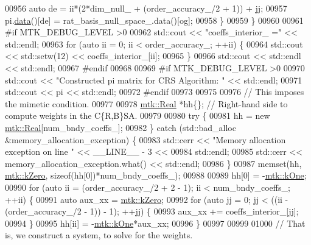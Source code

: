\begin{DoxyCode}
{{00956       \textcolor{keyword}{auto} de = ii*(2*dim\_null\_ + (order\_accuracy\_/2 + 1)) + jj;
00957       pi.\hyperlink{classmtk_1_1DenseMatrix_a16b3ff56feb2658b9fc7147d1de4d8e7}{data}()[de] = rat\_basis\_null\_space\_.data()[og];
00958     \}
00959   \}
00960 
00961 \textcolor{preprocessor}{  #if MTK\_DEBUG\_LEVEL >0}
00962   std::cout << \textcolor{stringliteral}{"coeffs\_interior\_ ="} << std::endl;
00963   \textcolor{keywordflow}{for} (\textcolor{keyword}{auto} ii = 0; ii < order\_accuracy\_; ++ii) \{
00964     std::cout << std::setw(12) << coeffs\_interior\_[ii];
00965   \}
00966   std::cout << std::endl << std::endl;
00967 \textcolor{preprocessor}{  #endif}
00968 
00969 \textcolor{preprocessor}{  #if MTK\_DEBUG\_LEVEL >0}
00970   std::cout << \textcolor{stringliteral}{"Constructed pi matrix for CRS Algorithm: "} << std::endl;
00971   std::cout << pi << std::endl;
00972 \textcolor{preprocessor}{  #endif}
00973 
00975 
00976   \textcolor{comment}{// This imposes the mimetic condition.}
00977 
00978   \hyperlink{group__c01-roots_gac080bbbf5cbb5502c9f00405f894857d}{mtk::Real} *hh\{\};  \textcolor{comment}{// Right-hand side to compute weights in the C\{R,B\}SA.}
00979 
00980   \textcolor{keywordflow}{try} \{
00981     hh = \textcolor{keyword}{new} \hyperlink{group__c01-roots_gac080bbbf5cbb5502c9f00405f894857d}{mtk::Real}[num\_bndy\_coeffs\_];
00982   \} \textcolor{keywordflow}{catch} (std::bad\_alloc &memory\_allocation\_exception) \{
00983     std::cerr << \textcolor{stringliteral}{"Memory allocation exception on line "} << \_\_LINE\_\_ - 3 <<
00984       std::endl;
00985     std::cerr << memory\_allocation\_exception.what() << std::endl;
00986   \}
00987   memset(hh, \hyperlink{group__c01-roots_ga59a451a5fae30d59649bcda274fea271}{mtk::kZero}, \textcolor{keyword}{sizeof}(hh[0])*num\_bndy\_coeffs\_);
00988 
00989   hh[0] = -\hyperlink{group__c01-roots_ga26407c24d43b6b95480943340d285c71}{mtk::kOne};
00990   \textcolor{keywordflow}{for} (\textcolor{keyword}{auto} ii = (order\_accuracy\_/2 + 2 - 1); ii < num\_bndy\_coeffs\_; ++ii) \{
00991     \textcolor{keyword}{auto} aux\_xx = \hyperlink{group__c01-roots_ga59a451a5fae30d59649bcda274fea271}{mtk::kZero};
00992     \textcolor{keywordflow}{for} (\textcolor{keyword}{auto} jj = 0; jj < ((ii - (order\_accuracy\_/2 - 1)) - 1); ++jj) \{
00993       aux\_xx += coeffs\_interior\_[jj];
00994     \}
00995     hh[ii] = -\hyperlink{group__c01-roots_ga26407c24d43b6b95480943340d285c71}{mtk::kOne}*aux\_xx;
00996   \}
00997 
00999 
01000   \textcolor{comment}{// That is, we construct a system, to solve for the weights.}
}}
\end{DoxyCode}
